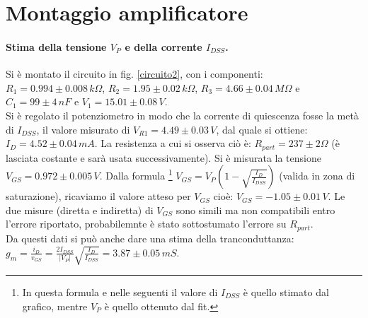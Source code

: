 \documentclass[10pt,a4paper]{article}
\begin{document}
\section{Montaggio amplificatore}

\paragraph{Stima della tensione $V_P$ e della corrente $I_{DSS}$.}
Si è montato il circuito in fig. \ref{circuito2}, con i componenti: $R_1 = 0.994\pm0.008 \, k\Omega $, $R_2 = 1.95\pm0.02 \, k \Omega $, $R_3 = 4.66 \pm 0.04 \, M \Omega$ e $C_1 = 99\pm4 \, nF$ e $V_1 = 15.01\pm0.08 \, V$. \\
Si è regolato il potenziometro in modo che la corrente di quiescenza fosse la metà di $I_{DSS}$, il valore misurato di $V_{R1} = 4.49 \pm 0.03 \, V$, dal quale si ottiene: $I_D = 4.52\pm0.04\,mA$. La resistenza a cui si osserva ciò è: $R_{part} = 237\pm2 \Omega$ (è lasciata costante e sarà usata successivamente). Si è misurata la tensione $V_{GS} = 0.972 \pm 0.005 \,V$. Dalla formula \footnote{In questa formula e nelle seguenti il valore di $I_{DSS}$ è quello stimato dal grafico, mentre $V_P$ è quello ottenuto dal fit.} $V_{GS} = V_{P} \left( 1 - \sqrt{\frac{I_D}{I_{DSS}}} \right)$ (valida in zona di saturazione), ricaviamo il valore atteso per $V_{GS}$ cioè: $V_{GS} = -1.05\pm0.01 \, V$. Le due misure (diretta e indiretta) di $V_{GS}$ sono simili ma non compatibili entro l'errore riportato, probabilemnte è stato sottostumato l'errore su $R_{part}$. \\
Da questi dati si può anche dare una stima della tranconduttanza: $g_m = \frac{i_D}{v_{GS}} = \frac{2I_{DSS}}{\vert V_P \vert} \sqrt{\frac{I_D}{I_{DSS}}} = 3.87\pm0.05\,mS$. 
\end{document}
